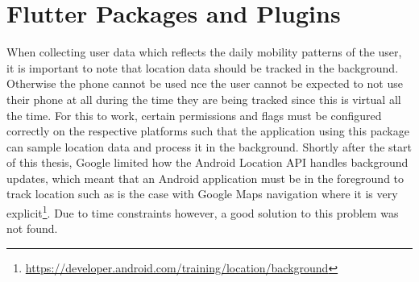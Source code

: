 \section{Flutter Packages and Plugins}
When collecting user data which reflects the daily mobility patterns of the user, it is important to note that location data should be tracked in the background. Otherwise the phone cannot be used nce the user cannot be expected to not use their phone at all during the time they are being tracked since this is virtual all the time. For this to work, certain permissions and flags must be configured correctly on the respective platforms such that the application using this package can sample location data and process it in the background. Shortly after the start of this thesis, Google limited how the Android Location API handles background updates, which meant that an Android application must be in the foreground to track location such as is the case with Google Maps navigation where it is very explicit\footnote{\url{https://developer.android.com/training/location/background}}. Due to time constraints however, a good solution to this problem was not found.